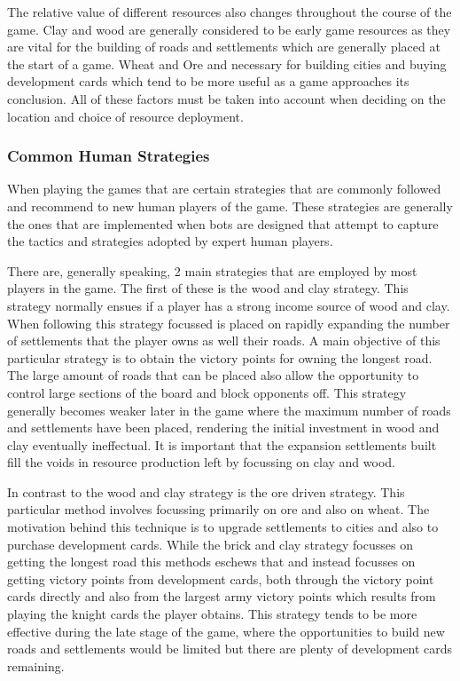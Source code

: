 \documentclass[]{article}
\begin{document}
\par The relative value of different resources also changes throughout the course of the game. Clay and wood are generally considered to be early game resources as they are vital for the building of roads and settlements which are generally placed at the start of a game. Wheat and Ore and necessary for building cities and buying development cards which tend to be more useful as a game approaches its conclusion. All of these factors must be taken into account when deciding on the location and choice of resource deployment.

\subsubsection{Common Human Strategies}
When playing the games that are certain strategies that are commonly followed and recommend to new human players of the game. These strategies are generally the ones that are implemented when bots are designed that attempt to capture the tactics and strategies adopted by expert human players.

\par There are, generally speaking, 2 main strategies that are employed by most players in the game. The first of these is the wood and clay strategy. This strategy normally ensues if a player has a strong income source of wood and clay. When following this strategy focussed is placed on rapidly expanding the number of settlements that the player owns as well their roads. A main objective of this particular strategy is to obtain the victory points for owning the longest road. The large amount of roads that can be placed also allow the opportunity to control large sections of the board and block opponents off. This strategy generally becomes weaker later in the game where the maximum number of roads and settlements have been placed, rendering the initial investment in wood and clay eventually ineffectual. It is important that the expansion settlements built fill the voids in resource production left by focussing on clay and wood.

\par In contrast to the wood and clay strategy is the ore driven strategy. This particular method involves focussing primarily on ore and also on wheat. The motivation behind this technique is to upgrade settlements to cities and also to purchase development cards. While the brick and clay strategy focusses on getting the longest road this methods eschews that and instead focusses on getting victory points from development cards, both through the victory point cards directly and also from the largest army victory points which results from playing the knight cards the player obtains. This strategy tends to be more effective during the late stage of the game, where the opportunities to build new roads and settlements would be limited but there are plenty of development cards remaining.
\end{document}
